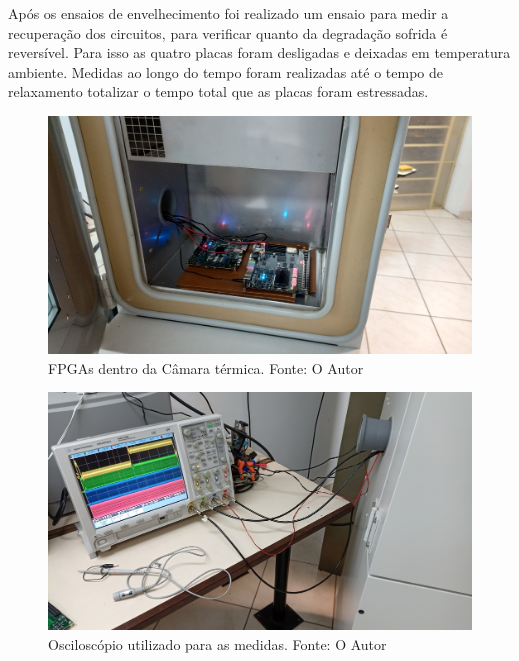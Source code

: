 Após os ensaios de envelhecimento foi realizado um ensaio para medir a recuperação dos circuitos, para verificar quanto da degradação sofrida é reversível. Para isso as quatro placas foram desligadas e deixadas em temperatura ambiente. Medidas ao longo do tempo foram realizadas até o tempo de relaxamento totalizar o tempo total que as placas foram estressadas.

\begin{figure}[H]
    \centering
    \includegraphics[width=\linewidth]{figures/Ensaios_FpgasNoForno.jpg}
    \caption{FPGAs dentro da Câmara térmica. Fonte: O Autor}
    \label{fig:CamTerm}
\end{figure}

\begin{figure}[H]
    \centering
    \includegraphics[width=\linewidth]{figures/Ensaios_Osciloscopio.jpg}
    \caption{Osciloscópio utilizado para as medidas. Fonte: O Autor}
    \label{fig:CamTerm}
\end{figure}
